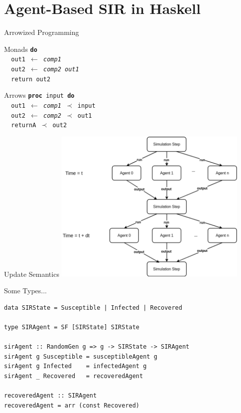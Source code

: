 \documentclass{beamer}
\begin{document}
\section{Agent-Based SIR in Haskell}
\begin{frame}{Arrowized Programming}
\begin{block}{Monads}
\texttt{\textbf{do} \\
\hspace{\parindent} \, out1 $\leftarrow$ \textit{comp1} \\
\hspace{\parindent} \, out2 $\leftarrow$ \textit{comp2 out1} \\
\hspace{\parindent} \, return out2}
\end{block}
	
\begin{block}{Arrows}
\texttt{\textbf{proc} input \textbf{do} \\
\hspace{\parindent} \, out1 $\leftarrow$ \textit{comp1} $\prec$ input \\
\hspace{\parindent} \, out2 $\leftarrow$ \textit{comp2} $\prec$ out1 \\
\hspace{\parindent} \, returnA $\prec$ out2}
\end{block}
\end{frame}

\begin{frame}{Update Semantics}
\hspace*{1cm}\includegraphics[width=0.7\textwidth]{./fig/parallel_strategy.png}\hspace*{-1cm}
\end{frame}

\begin{frame}[fragile]{Some Types...}
\begin{verbatim}
data SIRState = Susceptible | Infected | Recovered

type SIRAgent = SF [SIRState] SIRState 
  
sirAgent :: RandomGen g => g -> SIRState -> SIRAgent
sirAgent g Susceptible = susceptibleAgent g
sirAgent g Infected    = infectedAgent g
sirAgent _ Recovered   = recoveredAgent

recoveredAgent :: SIRAgent
recoveredAgent = arr (const Recovered)
\end{verbatim}
\end{frame}
\end{document}
